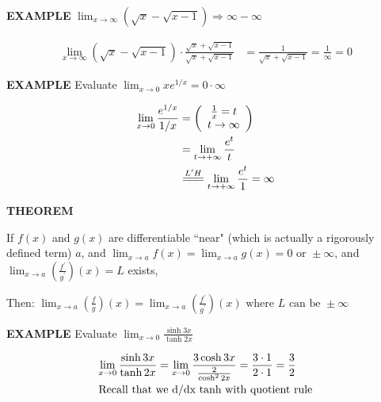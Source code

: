 \documentclass{article}
\begin{document}
\vspace{10pt}

{\bf{}EXAMPLE} $\displaystyle\lim_{x\to\infty}(\sqrt{x}-\sqrt{x-1})\Rightarrow\infty-\infty$

\begin{align*}
\lim_{x\to\infty}(\sqrt{x}-\sqrt{x-1})\cdot\frac{\sqrt{x}+\sqrt{x-1}}{\sqrt{x}+\sqrt{x-1}}&=\frac{1}{\sqrt{x}+\sqrt{x-1}}=\frac{1}{\infty}=0
\end{align*}

\vspace{10pt}

{\bf{}EXAMPLE} Evaluate $\displaystyle\lim_{x\to0}xe^{1/x}=0\cdot\infty$

\begin{align*}
\lim_{x\to0}\frac{e^{1/x}}{1/x}&=\left(\begin{array}{c}\frac{1}{x}=t\\t\to\infty\end{array}\right)\\
&=\lim_{t\to+\infty}\frac{e^t}{t}\\
&\overset{L'H}{=\joinrel=\joinrel=}\lim_{t\to+\infty}\frac{e^t}{1}=\infty
\end{align*}

\vspace{10pt}

{\bf{}THEOREM}

\vspace{5pt}

If $f(x)$ and $g(x)$ are differentiable ``near" (which is actually a rigorously defined term) $a$, and $\lim_{x\to a}f(x)=\lim_{x\to a}g(x)=\mbox{0 or }\pm\infty$, and $\lim_{x\to a}\left(\frac{f^\prime}{g^\prime}\right)(x)=L$ exists,

\vspace{10pt}

Then: $\lim_{x\to a}\left(\frac{f}{g}\right)(x)=\lim_{x\to a}\left(\frac{f^\prime}{g^\prime}\right)(x)\mbox{ where }L\mbox{ can be }\pm\infty$

\vspace{10pt}

{\bf{}EXAMPLE} Evaluate $\displaystyle\lim_{x\to0}\frac{\sinh3x}{\tanh2x}$

\begin{align*}
\lim_{x\to0}\frac{\sinh3x}{\tanh2x}&=\lim_{x\to0}\frac{3\cosh3x}{\frac{2}{\cosh^22x}}=\frac{3\cdot1}{2\cdot1}=\frac{3}{2}\\
\multicolumn{2}{l}{Recall that we d/dx tanh with quotient rule}
\end{align*}
\end{document}

